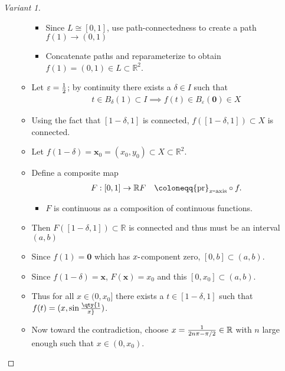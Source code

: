 \begin{solution}
\begin{proof}[Variant 1]
\begin{itemize}
\begin{itemize}
    \begin{itemize}
    \tightlist
    \item
      Since \(L \cong [0, 1]\), use path-connectedness to create a path
      \(f(1) \to (0, 1)\)
    \item
      Concatenate paths and reparameterize to obtain
      \(f(1) = (0, 1) \in L \subset {\mathbb{R}}^2\).
    \end{itemize}
  \item
    Let \(\varepsilon= {1\over 2}\); by continuity there exists a
    \(\delta\in I\) such that
    \begin{align*}
    t\in B_\delta(1) \subset I \implies f(t) \in B_\varepsilon(\mathbf{0}) \in X
    \end{align*}
  \item
    Using the fact that \([1-\delta, 1]\) is connected,
    \(f([1-\delta, 1]) \subset X\) is connected.
  \item
    Let
    \(f(1-\delta) = \mathbf{x}_0 = (x_0, y_0) \subset X\subset {\mathbb{R}}^2\).
  \item
    Define a composite map
    \begin{align*}     F: [0, 1] &\to {\mathbb{R}}     F &\coloneqq{\operatorname{pr}}_{x{\hbox{-}}\text{axis}} \circ f     .\end{align*}

    \begin{itemize}
    \tightlist
    \item
      \(F\) is continuous as a composition of continuous functions.
    \end{itemize}
  \item
    Then \(F([1-\delta, 1]) \subset {\mathbb{R}}\) is connected and thus
    must be an interval \((a, b)\)
  \item
    Since \(f(1) = \mathbf{0}\) which has \(x{\hbox{-}}\)component zero,
    \([0, b] \subset (a, b)\).
  \item
    Since \(f(1-\delta) = \mathbf{x}\), \(F(\mathbf{x}) = x_0\) and this
    \([0, x_0] \subset (a, b)\).
  \item
    Thus for all \(x \in (0, x_0]\) there exists a
    \(t\in [1-\delta, 1]\) such that \(f(t) = (x, \sin\qty{1\over x})\).
  \item
    Now toward the contradiction, choose
    \(x = {1 \over 2n\pi - \pi/2} \in {\mathbb{R}}\) with \(n\) large
    enough such that \(x\in (0, x_0)\).


\end{itemize}
\end{itemize}
\end{proof}
\end{solution}
